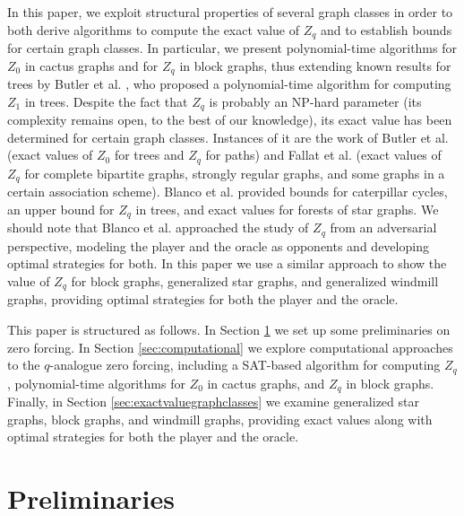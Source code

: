 \documentclass[11pt]{article}
\theoremstyle{plain}
\theoremstyle{definition}
\theoremstyle{remark}
\begin{document}
In this paper, we exploit structural properties of several graph classes in order to both derive algorithms to compute the exact value of $Z_q$ and to establish bounds for certain graph classes. In particular, we present polynomial-time algorithms for $Z_0$ in cactus graphs and for $Z_q$ in block graphs, thus extending known results for trees by Butler et al. \cite[Theorem 6]{butler2020properties}, who proposed a polynomial-time algorithm for computing $Z_1$ in trees. Despite the fact that $Z_q$ is probably an NP-hard parameter (its complexity remains open, to the best of our knowledge), its exact value has been determined for certain graph classes. Instances of it are the work of Butler et al. \cite{butler2020properties} (exact values of $Z_0$ for trees and $Z_q$ for paths) and Fallat et al. \cite{fallat2024q} (exact values of $Z_q$ for complete bipartite graphs, strongly regular graphs, and some graphs in a certain association scheme). Blanco et al. \cite{blanco2023z_q} provided bounds for caterpillar cycles, an upper bound for $Z_q$ in trees, and exact values for forests of star graphs. We should note that Blanco et al. approached the study of $Z_q$ from an adversarial perspective, modeling the player and the oracle as opponents and developing optimal strategies for both. In this paper we use a similar approach to show the value of $Z_q$ for block graphs, generalized star graphs, and generalized windmill graphs, providing optimal strategies for both the player and the oracle. %

 
This paper is structured as follows. In Section \ref{sec:preliminaries} we set up some preliminaries on zero forcing. In Section \ref{sec:computational} we explore computational approaches to the $q$-analogue zero forcing, including a SAT-based algorithm for computing $Z_q$, polynomial-time algorithms for $Z_0$ in cactus graphs, and $Z_q$ in block graphs. Finally, in Section \ref{sec:exactvaluegraphclasses} we examine generalized star graphs, block graphs, and windmill graphs, providing exact values along with optimal strategies for both the player and the oracle.

\section{Preliminaries}\label{sec:preliminaries}
\end{document}

